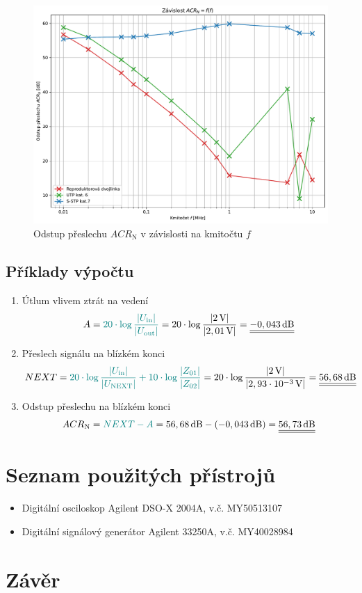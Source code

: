 \documentclass[a4paper, czech]{article}
\begin{document}
\begin{figure}[H]
    \centering
    \includegraphics[width=\textwidth]{grafy/graf3.pdf}
    \caption{Odstup přeslechu $ACR_\text{N}$ v závislosti na kmitočtu $f$}
\end{figure}

\subsection{Příklady výpočtu}

\begin{enumerate}
    \item Útlum vlivem ztrát na vedení
    \begin{multline*}
        A = \textcolor{teal}{20 \cdot \log \frac{\left|U_\text{in}\right|}{\left|U_\text{out}\right|}} = 20 \cdot \log \frac{\left|2\,\text{V}\right|}{\left|2,01\,\text{V}\right|} = \underline{\underline{-0,043\,\text{dB}}} \hfill
    \end{multline*}
    \item Přeslech signálu na blízkém konci
    \begin{multline*}
        NEXT = \textcolor{teal}{20 \cdot \log \frac{\left|U_\text{in}\right|}{\left|U_\text{NEXT}\right|} + 10 \cdot \log \frac{\left|Z_{01}\right|}{\left|Z_{02}\right|}} = 20 \cdot \log \frac{\left|2\,\text{V}\right|}{\left|2,93 \cdot 10^{-3}\,\text{V}\right|} = \underline{\underline{56,68\,\text{dB}}} \hfill
    \end{multline*}
    \item Odstup přeslechu na blízkém konci
    \begin{multline*}
        ACR_\text{N} = \textcolor{teal}{NEXT - A} = 56,68\,\text{dB} - (-0,043\,\text{dB}) =\underline{\underline{56,73\,\text{dB}}} \hfill
    \end{multline*}
\end{enumerate}

\section{Seznam použitých přístrojů}

\begin{itemize}
    \item Digitální osciloskop Agilent DSO-X 2004A, v.č. MY50513107
    \item Digitální signálový generátor Agilent 33250A, v.č. MY40028984
\end{itemize}

\section{Závěr}
\end{document}
